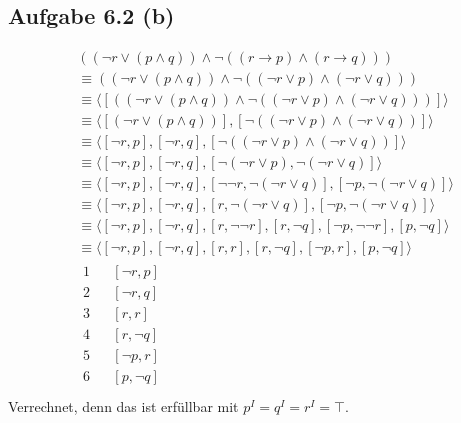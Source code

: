 \documentclass[12pt,a4paper]{article}
\newcommand{\Res}{\text{Res}}
\begin{document}
\subsection*{Aufgabe 6.2 (b)}
\begin{align*}
&((\neg r\vee(p\wedge q))\wedge\neg((r\to p)\wedge(r\to q)))\\
&\equiv
((\neg r\vee(p\wedge q))\wedge\neg((\neg r\vee p)\wedge(\neg r\vee q)))\\
&\equiv
\langle[((\neg r\vee(p\wedge q))\wedge\neg((\neg r\vee p)\wedge(\neg r\vee q)))]\rangle\\
&\equiv
\langle[(\neg r\vee(p\wedge q))],[\neg((\neg r\vee p)\wedge(\neg r\vee q))]\rangle\\
&\equiv
\langle[\neg r,p],[\neg r, q],[\neg((\neg r\vee p)\wedge(\neg r\vee q))]\rangle\\
&\equiv
\langle[\neg r,p],[\neg r, q],[\neg(\neg r\vee p),\neg(\neg r\vee q)]\rangle\\
&\equiv
\langle[\neg r,p],[\neg r, q],[\neg\neg r,\neg(\neg r\vee q)],[\neg p,\neg(\neg r\vee q)]\rangle\\
&\equiv
\langle[\neg r,p],[\neg r, q],[r,\neg(\neg r\vee q)],[\neg p,\neg(\neg r\vee q)]\rangle\\
&\equiv
\langle[\neg r,p],[\neg r, q],[r,\neg\neg r],[r,\neg q],[\neg p,\neg\neg r],[p,\neg q]\rangle\\
&\equiv
\langle[\neg r,p],[\neg r, q],[r,r],[r,\neg q],[\neg p,r],[p,\neg q]\rangle\\
&\begin{array}{rll}
1 &&[\neg r,p]\\
2 &&[\neg r,q]\\
3 &&[r,r]\\
4 &&[r,\neg q]\\
5 &&[\neg p,r]\\
6 &&[p,\neg q]\\
\end{array}
\end{align*}
Verrechnet, denn das ist erfüllbar mit $p^I=q^I=r^I=\top$.
\end{document}
